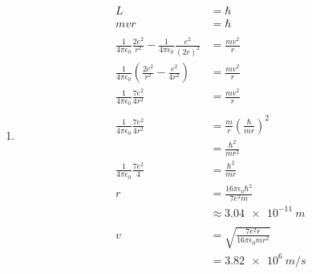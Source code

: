 \documentclass{article}
\begin{document}
\begin{enumerate}
  \item

        \begin{align*}
          L                                                                                             & = \hbar                                           \\
          m v r                                                                                         & = \hbar                                           \\ \\
          \frac{1}{4 \pi \epsilon_0} \frac{2 e^2}{r^2} - \frac{1}{4 \pi \epsilon_0} \frac{e^2}{(2 r)^2} & = \frac{m v^2}{r}                                 \\
          \frac{1}{4 \pi \epsilon_0} \left( \frac{2 e^2}{r^2} - \frac{e^2}{4 r^2} \right)               & = \frac{m v^2}{r}                                 \\
          \frac{1}{4 \pi \epsilon_0} \frac{7 e^2}{4 r^2}                                                & = \frac{m v^2}{r}                                 \\ \\
          \frac{1}{4 \pi \epsilon_0} \frac{7 e^2}{4 r^2}                                                & = \frac{m}{r} \left( \frac{\hbar}{m r} \right)^2  \\
                                                                                                        & = \frac{\hbar^2}{m r^3}                           \\
          \frac{1}{4 \pi \epsilon_0} \frac{7 e^2}{4}                                                    & = \frac{\hbar^2}{m r}                             \\
          r                                                                                             & = \frac{16 \pi \epsilon_0 \hbar^2}{7 e^2 m}       \\
                                                                                                        & \approx \qty{3.04e-11}{m}                         \\ \\
          v                                                                                             & =  \sqrt{\frac{7 e^2 r}{16 \pi \epsilon_0 m r^2}} \\
                                                                                                        & = \qty{3.82e6}{m/s}
        \end{align*}


\end{enumerate}
\end{document}
